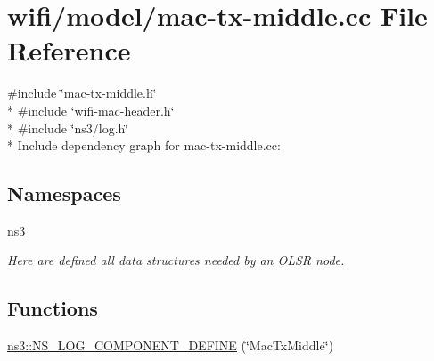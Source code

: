 \hypertarget{mac-tx-middle_8cc}{}\section{wifi/model/mac-\/tx-\/middle.cc File Reference}
\label{mac-tx-middle_8cc}
{\ttfamily \#include \char`\"{}mac-\/tx-\/middle.\+h\char`\"{}}\\*
{\ttfamily \#include \char`\"{}wifi-\/mac-\/header.\+h\char`\"{}}\\*
{\ttfamily \#include \char`\"{}ns3/log.\+h\char`\"{}}\\*
Include dependency graph for mac-\/tx-\/middle.cc\+:
\subsection*{Namespaces}
\begin{DoxyCompactItemize}
\item 
 \hyperlink{namespacens3}{ns3}
\begin{DoxyCompactList}\small\item\em Here are defined all data structures needed by an O\+L\+SR node. \end{DoxyCompactList}\end{DoxyCompactItemize}
\subsection*{Functions}
\begin{DoxyCompactItemize}
\item 
\hyperlink{namespacens3_a01e707263b5785e25ad0ee1c1fcbbae2}{ns3\+::\+N\+S\+\_\+\+L\+O\+G\+\_\+\+C\+O\+M\+P\+O\+N\+E\+N\+T\+\_\+\+D\+E\+F\+I\+NE} (\char`\"{}Mac\+Tx\+Middle\char`\"{})
\end{DoxyCompactItemize}
